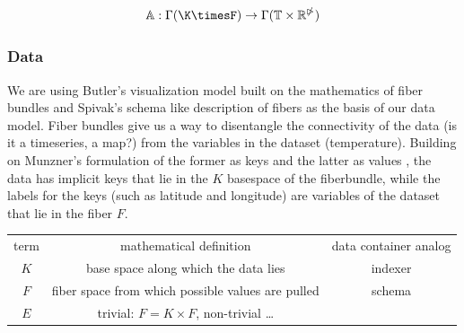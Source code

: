 \documentclass[../intro.tex]{subfiles}
\begin{document}
\begin{equation}
    \mathbb{A}: \Gamma(\K\timesF) \to \Gamma(\mathbb{T\times R^{7}})
\end{equation}



\subsubsection{Data}
We are using Butler's visualization model built on the mathematics of fiber bundles \cite{butlerVectorBundleClassesForm1992,butlerVisualizationModelBased1989} and Spivak's schema like description of fibers \cite{spivakSIMPLICIALDATABASES} as the basis of our data model. Fiber bundles give us a way to disentangle the connectivity of the data (is it a timeseries, a map?) from the variables in the dataset (temperature). Building on Munzner's formulation of the former as keys and the latter as values \cite{munznerWhatDataAbstraction2014}, the data has implicit keys that lie in the $K$ basespace of the fiberbundle, while the labels for the keys (such as latitude and longitude) are variables of the dataset that lie in the fiber $F$. 


\begin{center}
    \begin{tabular}{ c c c }
     term & mathematical definition & data container analog\\
      $K$ & base space along which the data lies & indexer \\
      $F$ & fiber space from which possible values are pulled & schema \\
      $E$ & trivial: $F= K \times F$, non-trivial \dots & 
    \end{tabular}
\end{center}
\end{document}
